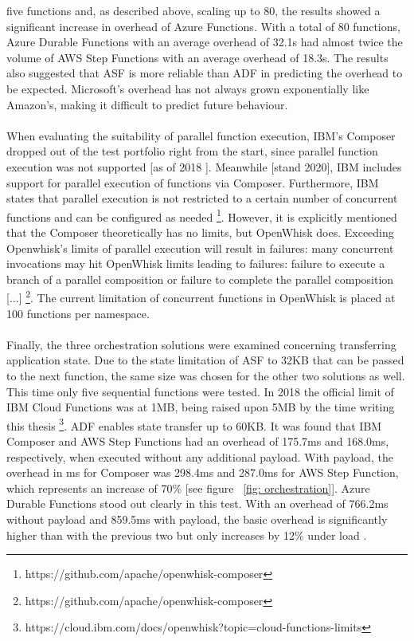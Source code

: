 \documentclass[11pt]{article}
\begin{document}
five functions and, as described above, scaling up to 80, the results showed a significant increase in overhead of Azure Functions. With a total of 80 functions, Azure Durable Functions with an average overhead of 32.1s had almost twice the volume of AWS Step Functions with an average overhead of 18.3s. The results also suggested that ASF is more reliable than ADF in predicting the overhead to be expected. Microsoft's overhead has not always grown exponentially like Amazon's, making it difficult to predict future behaviour.\\\\ When evaluating the suitability of parallel function execution, IBM's Composer dropped out of the test portfolio right from the start, since parallel function execution was not supported [as of 2018 \cite{lopez2018comparison}]. Meanwhile [stand 2020], IBM includes support for parallel execution of functions via Composer. Furthermore, IBM states that parallel execution is not restricted to a certain number of concurrent functions and can be configured as needed \footnote{https://github.com/apache/openwhisk-composer }. However, it is explicitly mentioned that the Composer theoretically has no limits, but OpenWhisk does. Exceeding Openwhisk's limits of parallel execution will result in failures: \glqq[...] many concurrent invocations may hit OpenWhisk limits leading to failures: failure to execute a branch of a parallel composition or failure to complete the parallel composition [...]\grqq{} \footnote{https://github.com/apache/openwhisk-composer}. The current limitation of concurrent functions in OpenWhisk is placed at 100 functions per namespace.\\\\ Finally, the three orchestration solutions were examined concerning transferring application state. Due to the state limitation of ASF to 32KB that can be passed to the next function, the same size was chosen for the other two solutions as well. This time only five sequential functions were tested. In 2018 the official limit of IBM Cloud Functions was at 1MB, being raised upon 5MB by the time writing this thesis \footnote{https://cloud.ibm.com/docs/openwhisk?topic=cloud-functions-limits}. ADF enables state transfer up to 60KB. It was found that IBM Composer and AWS Step Functions had an overhead of 175.7ms and 168.0ms, respectively,  when executed without any additional payload. With payload, the overhead in ms for Composer was 298.4ms and 287.0ms for AWS Step Function, which represents an increase of 70\% [see figure ~\ref{fig: orchestration}]. Azure Durable Functions stood out clearly in this test. With an overhead of 766.2ms without payload and 859.5ms with payload, the basic overhead is significantly higher than with the previous two but only increases by 12\% under load \cite{lopez2018comparison}.
\end{document}
